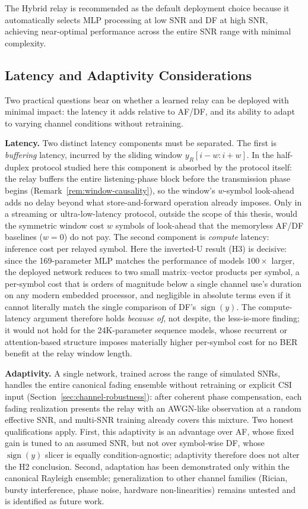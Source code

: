 The Hybrid relay is recommended as the default deployment choice because it automatically selects MLP processing at low SNR and DF at high SNR, achieving near-optimal performance across the entire SNR range with minimal complexity.

\subsection{Latency and Adaptivity Considerations}\label{sec:latency-and-adaptivity-considerations}

Two practical questions bear on whether a learned relay can be deployed with minimal impact: the latency it adds relative to AF/DF, and its ability to adapt to varying channel conditions without retraining.

\textbf{Latency.} Two distinct latency components must be separated. The first is \emph{buffering} latency, incurred by the sliding window $y_R[i-w:i+w]$. In the half-duplex protocol studied here this component is absorbed by the protocol itself: the relay buffers the entire listening-phase block before the transmission phase begins (Remark~\ref{rem:window-causality}), so the window's $w$-symbol look-ahead adds no delay beyond what store-and-forward operation already imposes. Only in a streaming or ultra-low-latency protocol, outside the scope of this thesis, would the symmetric window cost $w$ symbols of look-ahead that the memoryless AF/DF baselines ($w=0$) do not pay. The second component is \emph{compute} latency: inference cost per relayed symbol. Here the inverted-U result (H3) is decisive: since the 169-parameter MLP matches the performance of models $100\times$ larger, the deployed network reduces to two small matrix--vector products per symbol, a per-symbol cost that is orders of magnitude below a single channel use's duration on any modern embedded processor, and negligible in absolute terms even if it cannot literally match the single comparison of DF's $\operatorname{sign}(y)$. The compute-latency argument therefore holds \emph{because of}, not despite, the less-is-more finding; it would not hold for the 24K-parameter sequence models, whose recurrent or attention-based structure imposes materially higher per-symbol cost for no BER benefit at the relay window length.

\textbf{Adaptivity.} A single network, trained across the range of simulated SNRs, handles the entire canonical fading ensemble without retraining or explicit CSI input (Section~\ref{sec:channel-robustness}): after coherent phase compensation, each fading realization presents the relay with an AWGN-like observation at a random effective SNR, and multi-SNR training already covers this mixture. Two honest qualifications apply. First, this adaptivity is an advantage over AF, whose fixed gain is tuned to an assumed SNR, but not over symbol-wise DF, whose $\operatorname{sign}(y)$ slicer is equally condition-agnostic; adaptivity therefore does not alter the H2 conclusion. Second, adaptation has been demonstrated only within the canonical Rayleigh ensemble; generalization to other channel families (Rician, bursty interference, phase noise, hardware non-linearities) remains untested and is identified as future work.

